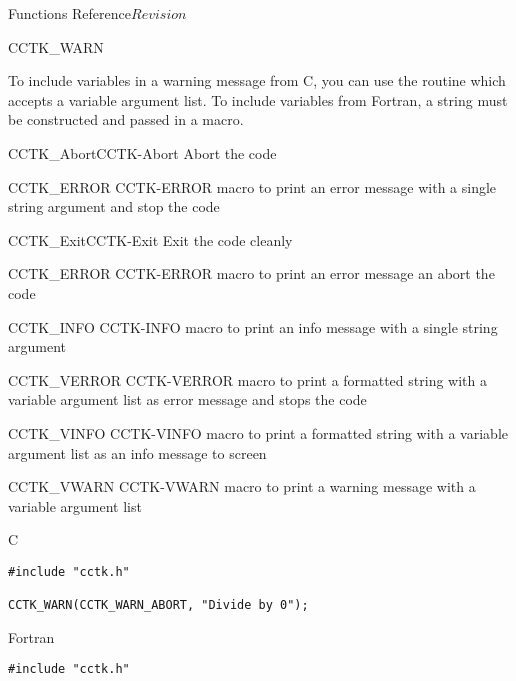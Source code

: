 \begin{cactuspart}{ Functions Reference}{}{$Revision$}
\begin{FunctionDescription}{CCTK\_WARN}
\begin{Discussion}
To include variables in a warning message from C, you can use the routine
 which accepts a variable argument list.
To include variables from Fortran, a string must be constructed and passed
in a  macro.
\end{Discussion}

\begin{SeeAlsoSection}
\begin{SeeAlso2}{CCTK\_Abort}{CCTK-Abort}
Abort the code
\end{SeeAlso2}
\begin{SeeAlso2} {CCTK\_ERROR} {CCTK-ERROR}
macro to print an error message with a single string argument and stop
the code
\end{SeeAlso2}
\begin{SeeAlso2}{CCTK\_Exit}{CCTK-Exit}
Exit the code cleanly
\end{SeeAlso2}
\begin{SeeAlso2} {CCTK\_ERROR} {CCTK-ERROR}
macro to print an error message an abort the code
\end{SeeAlso2}
\begin{SeeAlso2} {CCTK\_INFO} {CCTK-INFO}
macro to print an info message with a single string argument
\end{SeeAlso2}
\begin{SeeAlso2} {CCTK\_VERROR} {CCTK-VERROR}
macro to print a formatted string with a variable argument list as error
message and stops the code
\end{SeeAlso2}
\begin{SeeAlso2} {CCTK\_VINFO} {CCTK-VINFO}
macro to print a formatted string with a variable argument list as an
info message to screen
\end{SeeAlso2}
\begin{SeeAlso2} {CCTK\_VWARN} {CCTK-VWARN}
macro to print a warning message with a variable argument list
\end{SeeAlso2}
\end{SeeAlsoSection}

\begin{ExampleSection}
\begin{Example}{C}
\begin{verbatim}
#include "cctk.h"

CCTK_WARN(CCTK_WARN_ABORT, "Divide by 0");
\end{verbatim}
\end{Example}
\begin{Example}{Fortran}
\begin{verbatim}
#include "cctk.h"


\end{verbatim}
\end{Example}
\end{ExampleSection}
\end{FunctionDescription}
\end{cactuspart}
